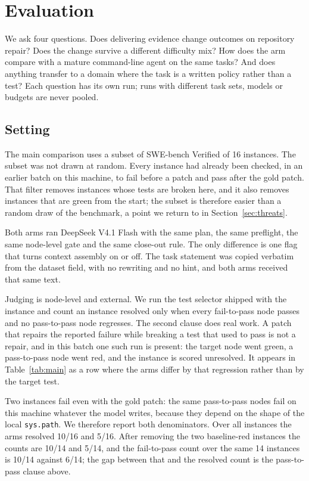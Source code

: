 \section{Evaluation}

We ask four questions. Does delivering evidence change outcomes on repository repair? Does the change survive a different difficulty mix? How does the arm compare with a mature command-line agent on the same tasks? And does anything transfer to a domain where the task is a written policy rather than a test? Each question has its own run; runs with different task sets, models or budgets are never pooled.

\subsection{Setting}

The main comparison uses a subset of SWE-bench Verified \citep{jimenez2024swebench} of 16 instances. The subset was not drawn at random. Every instance had already been checked, in an earlier batch on this machine, to fail before a patch and pass after the gold patch. That filter removes instances whose tests are broken here, and it also removes instances that are green from the start; the subset is therefore easier than a random draw of the benchmark, a point we return to in Section~\ref{sec:threats}.

Both arms ran DeepSeek V4.1 Flash with the same plan, the same preflight, the same node-level gate and the same close-out rule. The only difference is one flag that turns context assembly on or off. The task statement was copied verbatim from the dataset field, with no rewriting and no hint, and both arms received that same text.

Judging is node-level and external. We run the test selector shipped with the instance and count an instance resolved only when every fail-to-pass node passes and no pass-to-pass node regresses. The second clause does real work. A patch that repairs the reported failure while breaking a test that used to pass is not a repair, and in this batch one such run is present: the target node went green, a pass-to-pass node went red, and the instance is scored unresolved. It appears in Table~\ref{tab:main} as a row where the arms differ by that regression rather than by the target test.

Two instances fail even with the gold patch: the same pass-to-pass nodes fail on this machine whatever the model writes, because they depend on the shape of the local \texttt{sys.path}. We therefore report both denominators. Over all instances the arms resolved 10/16 and 5/16. After removing the two baseline-red instances the counts are 10/14 and 5/14, and the fail-to-pass count over the same 14 instances is 10/14 against 6/14; the gap between that and the resolved count is the pass-to-pass clause above.

